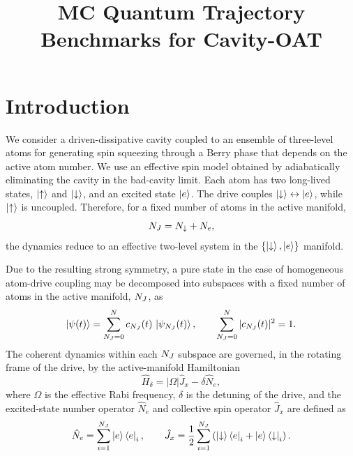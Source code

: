 \documentclass[a4paper,11pt]{article}
\title{MC Quantum Trajectory Benchmarks for Cavity-OAT}
\date{}
\begin{document}
\maketitle

\tableofcontents
\newpage

\section{Introduction}
We consider a driven-dissipative cavity coupled to an ensemble of three-level atoms for generating spin squeezing through a Berry phase that depends on the active atom number. We use an effective spin model obtained by adiabatically eliminating the cavity in the bad-cavity limit. Each atom has two long-lived states, $\ket{\uparrow}$ and $\ket{\downarrow}$, and an excited state $\ket{e}$. The drive couples $\ket{\downarrow} \leftrightarrow \ket{e}$, while $\ket{\uparrow}$ is uncoupled. Therefore, for a fixed number of atoms in the active manifold,
\begin{equation}
    N_J = N_\downarrow + N_e,
\end{equation}
the dynamics reduce to an effective two-level system in the $\{\ket{\downarrow},\ket{e}\}$ manifold.
\par

Due to the resulting strong symmetry, a pure state in the case of homogeneous atom-drive coupling may be decomposed into subspaces with a fixed number of atoms in the active manifold, $N_J$, as
\begin{equation}
    \ket{\psi(t)}
    = \sum_{N_J=0}^{N}
    c_{N_J}(t)\,\ket{\psi_{N_J}(t)},
    \qquad
    \sum_{N_J=0}^{N} |c_{N_J}(t)|^2 = 1.
\end{equation}
The coherent dynamics within each $N_J$ subspace are governed, in the rotating frame of the drive, by the active-manifold Hamiltonian
\begin{equation}
    \hat H_\delta = |\Omega| \hat J_x - \delta \hat N_e,
\end{equation}
where $\Omega$ is the effective Rabi frequency, $\delta$ is the detuning of the drive, and the excited-state number operator $\hat N_e$ and collective spin operator $\hat J_x$ are defined as
\begin{equation}
    \hat N_e = \sum_{i=1}^{N_J} \ket{e}\bra{e}_i,
    \qquad
    \hat J_x = \frac{1}{2}\sum_{i=1}^{N_J} \left(\ket{\downarrow}\bra{e}_i + \ket{e}\bra{\downarrow}_i\right).
\end{equation}
\par
\end{document}
